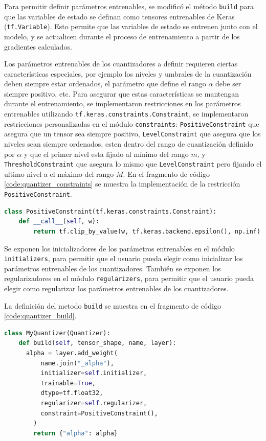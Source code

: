 Para permitir definir parámetros entrenables, se modificó el método \texttt{build} para que las variables de estado se definan como tensores entrenables de Keras (\texttt{tf.Variable}). Esto permite que las variables de estado se entrenen junto con el modelo, y se actualicen durante el proceso de entrenamiento a partir de los gradientes calculados.

Los parámetros entrenables de los cuantizadores a definir requieren ciertas características especiales, por ejemplo los niveles y umbrales de la cuantización deben siempre estar ordenados, el parámetro que define el rango $\alpha$ debe ser siempre positivo, etc. Para asegurar que estas características se mantengan durante el entrenamiento, se implementaron restricciones en los parámetros entrenables utilizando \texttt{tf.keras.constraints.Constraint}, se implementaron restricciones personalizadas en el módulo \texttt{constraints}: \texttt{PositiveConstraint} que asegura que un tensor sea siempre positivo, \texttt{LevelConstraint} que asegura que los niveles sean siempre ordenados, esten dentro del rango de cuantización definido por $\alpha$ y que el primer nivel esta fijado al mínimo del rango $m$, y \texttt{ThresholdConstraint} que asegura lo mismo que \texttt{LevelConstraint} pero fijando el ultimo nivel a el máximo del rango $M$. En el fragmento de código \ref{code:quantizer_constraints} se muestra la implementación de la restricción \texttt{PositiveConstraint}.

\begin{lstlisting}[language=Python,label=code:quantizer_constraints,caption=Definición de restricciones para parámetros entrenables.]
  class PositiveConstraint(tf.keras.constraints.Constraint):
    def __call__(self, w):
        return tf.clip_by_value(w, tf.keras.backend.epsilon(), np.inf)
\end{lstlisting}

Se exponen los inicializadores de los parámetros entrenables en el módulo \texttt{initializers}, para permitir que el usuario pueda elegir como inicializar los parámetros entrenables de los cuantizadores. También se exponen los regularizadores en el módulo \texttt{regularizers}, para permitir que el usuario pueda elegir como regularizar los parámetros entrenables de los cuantizadores.

La definición del metodo \texttt{build} se muestra en el fragmento de código \ref{code:quantizer_build}.

\begin{lstlisting}[language=Python,label=code:quantizer_build,caption=Definición del método build de un cuantizador con parámetros entrenables.]
  class MyQuantizer(Quantizer):
    def build(self, tensor_shape, name, layer):
      alpha = layer.add_weight(
          name.join("_alpha"),
          initializer=self.initializer,
          trainable=True,
          dtype=tf.float32,
          regularizer=self.regularizer,
          constraint=PositiveConstraint(),
        )
        return {"alpha": alpha}
\end{lstlisting}


